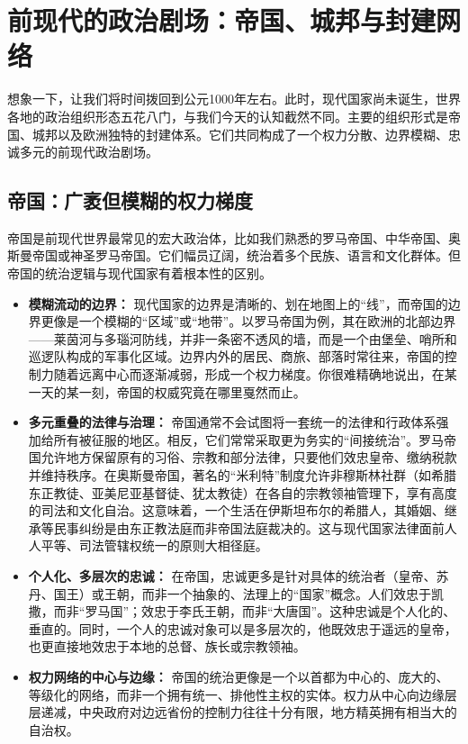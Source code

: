 \hrulefill

\section{前现代的政治剧场：帝国、城邦与封建网络}

想象一下，让我们将时间拨回到公元1000年左右。此时，现代国家尚未诞生，世界各地的政治组织形态五花八门，与我们今天的认知截然不同。主要的组织形式是帝国、城邦以及欧洲独特的封建体系。它们共同构成了一个权力分散、边界模糊、忠诚多元的前现代政治剧场。

\subsection{帝国：广袤但模糊的权力梯度}

帝国是前现代世界最常见的宏大政治体，比如我们熟悉的罗马帝国、中华帝国、奥斯曼帝国或神圣罗马帝国。它们幅员辽阔，统治着多个民族、语言和文化群体。但帝国的统治逻辑与现代国家有着根本性的区别。

\begin{itemize}
    \item \textbf{模糊流动的边界：} 现代国家的边界是清晰的、划在地图上的“线”，而帝国的边界更像是一个模糊的“区域”或“地带”。以罗马帝国为例，其在欧洲的北部边界——莱茵河与多瑙河防线，并非一条密不透风的墙，而是一个由堡垒、哨所和巡逻队构成的军事化区域。边界内外的居民、商旅、部落时常往来，帝国的控制力随着远离中心而逐渐减弱，形成一个权力梯度。你很难精确地说出，在某一天的某一刻，帝国的权威究竟在哪里戛然而止。
    \item \textbf{多元重叠的法律与治理：} 帝国通常不会试图将一套统一的法律和行政体系强加给所有被征服的地区。相反，它们常常采取更为务实的“间接统治”。罗马帝国允许地方保留原有的习俗、宗教和部分法律，只要他们效忠皇帝、缴纳税款并维持秩序。在奥斯曼帝国，著名的“米利特”制度允许非穆斯林社群（如希腊东正教徒、亚美尼亚基督徒、犹太教徒）在各自的宗教领袖管理下，享有高度的司法和文化自治。这意味着，一个生活在伊斯坦布尔的希腊人，其婚姻、继承等民事纠纷是由东正教法庭而非帝国法庭裁决的。这与现代国家法律面前人人平等、司法管辖权统一的原则大相径庭。
    \item \textbf{个人化、多层次的忠诚：} 在帝国，忠诚更多是针对具体的统治者（皇帝、苏丹、国王）或王朝，而非一个抽象的、法理上的“国家”概念。人们效忠于凯撒，而非“罗马国”；效忠于李氏王朝，而非“大唐国”。这种忠诚是个人化的、垂直的。同时，一个人的忠诚对象可以是多层次的，他既效忠于遥远的皇帝，也更直接地效忠于本地的总督、族长或宗教领袖。
    \item \textbf{权力网络的中心与边缘：} 帝国的统治更像是一个以首都为中心的、庞大的、等级化的网络，而非一个拥有统一、排他性主权的实体。权力从中心向边缘层层递减，中央政府对边远省份的控制力往往十分有限，地方精英拥有相当大的自治权。
\end{itemize}

